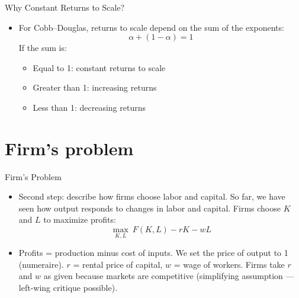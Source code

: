 \documentclass[10pt,aspectratio=169]{beamer}
\begin{document}
\begin{frame}{Why Constant Returns to Scale?}

\begin{itemize}
    \item For Cobb--Douglas, returns to scale depend on the sum of the exponents:
    \[
        \alpha + (1-\alpha) = 1
    \]
    \itemvso If the sum is:
    \begin{itemize}
        \item Equal to 1: constant returns to scale
        \item Greater than 1: increasing returns 
        \item Less than 1: decreasing returns
    \end{itemize}
\end{itemize}

\end{frame}

\section{Firm's problem}

\begin{frame}{Firm's Problem}

\begin{itemize}
    \item Second step: describe how firms choose labor and capital.
    \itemvso So far, we have seen how output responds to changes in labor and capital.
    \itemvso Firms choose $K$ and $L$ to maximize profits:
    \[
        \max_{K,L} \ F(K,L) - r K - w L
    \]
    \vspace{-0.4em}
    \item Profits = production minus cost of inputs.
    \itemvso We set the price of output to 1 (numeraire).
    \itemvso $r$ = rental price of capital, $w$ = wage of workers.
    \itemvso Firms take $r$ and $w$ as given because markets are competitive 
    (simplifying assumption — left-wing critique possible).
\end{itemize}

\end{frame}
\end{document}
